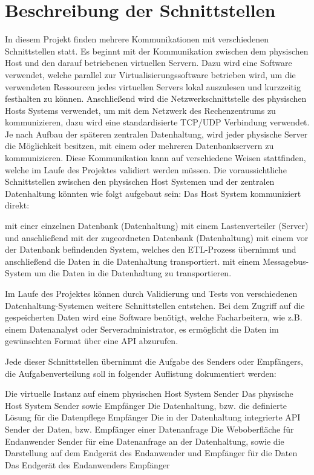 \section{Beschreibung der Schnittstellen}

In diesem Projekt finden mehrere Kommunikationen mit verschiedenen
Schnittstellen statt. Es beginnt mit der Kommunikation zwischen dem
physischen Host und den darauf betriebenen virtuellen Servern. Dazu wird eine
Software verwendet, welche parallel zur Virtualisierungssoftware betrieben
wird, um die verwendeten Ressourcen jedes virtuellen Servers lokal auszulesen
und kurzzeitig festhalten zu können. Anschließend wird die
Netzwerkschnittstelle des physischen Hosts Systems verwendet, um mit dem
Netzwerk des Rechenzentrums zu kommunizieren, dazu wird eine standardisierte
TCP/UDP Verbindung verwendet. Je nach Aufbau der späteren zentralen
Datenhaltung, wird jeder physische Server die Möglichkeit besitzen, mit einem
oder mehreren Datenbankservern zu kommunizieren. Diese Kommunikation kann auf
verschiedene Weisen stattfinden, welche im Laufe des Projektes validiert
werden müssen. Die voraussichtliche Schnittstellen zwischen den physischen
Host Systemen und der zentralen Datenhaltung könnten wie folgt aufgebaut sein:
Das Host System kommuniziert direkt:

\begin{outline}
  \1 mit einer einzelnen Datenbank (Datenhaltung)
  \1 mit einem Lastenverteiler (Server) und anschließend mit der zugeordneten
  Datenbank (Datenhaltung)
  \1 mit einem vor der Datenbank befindenden System, welches den ETL-Prozess
  übernimmt und anschließend die Daten in die Datenhaltung transportiert.
  \1 mit einem Messagebus-System um die Daten in die Datenhaltung zu
  transportieren.
\end{outline}
Im Laufe des Projektes können durch Validierung und Tests von verschiedenen
Datenhaltung-Systemen weitere Schnittstellen entstehen. Bei dem Zugriff auf
die gespeicherten Daten wird eine Software benötigt, welche Facharbeitern, wie
z.B. einem Datenanalyst oder Serveradministrator, es ermöglicht die Daten im
gewünschten Format über eine API abzurufen.

Jede dieser Schnittstellen übernimmt die Aufgabe des Senders oder Empfängers,
die Aufgabenverteilung soll in folgender Auflistung dokumentiert werden:
\begin{outline}
  \1 Die virtuelle Instanz auf einem physischen Host System
    \2 Sender
  \1 Das physische Host System
    \2 Sender sowie Empfänger
  \1 Die Datenhaltung, bzw. die definierte Lösung für die Datenpflege
    \2 Empfänger
  \1 Die in der Datenhaltung integrierte API
    \2 Sender der Daten, bzw. Empfänger einer Datenanfrage
  \1 Die Weboberfläche für Endanwender
    \2 Sender für eine Datenanfrage an der Datenhaltung, sowie die Darstellung
    auf dem Endgerät des Endanwender und Empfänger für die Daten
  \1 Das Endgerät des Endanwenders
    \2 Empfänger
\end{outline}


